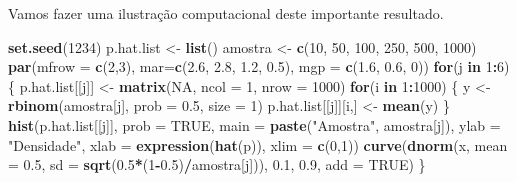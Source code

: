 \documentclass[10pt,a4paper]{book}
\newenvironment{Shaded}{\begin{snugshade}}{\end{snugshade}}
\newcommand{\KeywordTok}[1]{\textcolor[rgb]{0.13,0.29,0.53}{\textbf{#1}}}
\newcommand{\DataTypeTok}[1]{\textcolor[rgb]{0.13,0.29,0.53}{#1}}
\newcommand{\DecValTok}[1]{\textcolor[rgb]{0.00,0.00,0.81}{#1}}
\newcommand{\FloatTok}[1]{\textcolor[rgb]{0.00,0.00,0.81}{#1}}
\newcommand{\StringTok}[1]{\textcolor[rgb]{0.31,0.60,0.02}{#1}}
\newcommand{\OtherTok}[1]{\textcolor[rgb]{0.56,0.35,0.01}{#1}}
\newcommand{\ControlFlowTok}[1]{\textcolor[rgb]{0.13,0.29,0.53}{\textbf{#1}}}
\newcommand{\OperatorTok}[1]{\textcolor[rgb]{0.81,0.36,0.00}{\textbf{#1}}}
\newcommand{\NormalTok}[1]{#1}
\begin{document}
Vamos fazer uma ilustração computacional deste importante resultado.

\begin{Shaded}
\begin{Highlighting}[]
\KeywordTok{set.seed}\NormalTok{(}\DecValTok{1234}\NormalTok{)}
\NormalTok{p.hat.list <-}\StringTok{ }\KeywordTok{list}\NormalTok{()}
\NormalTok{amostra <-}\StringTok{ }\KeywordTok{c}\NormalTok{(}\DecValTok{10}\NormalTok{, }\DecValTok{50}\NormalTok{, }\DecValTok{100}\NormalTok{, }\DecValTok{250}\NormalTok{, }\DecValTok{500}\NormalTok{, }\DecValTok{1000}\NormalTok{)}
\KeywordTok{par}\NormalTok{(}\DataTypeTok{mfrow =} \KeywordTok{c}\NormalTok{(}\DecValTok{2}\NormalTok{,}\DecValTok{3}\NormalTok{), }\DataTypeTok{mar=}\KeywordTok{c}\NormalTok{(}\FloatTok{2.6}\NormalTok{, }\FloatTok{2.8}\NormalTok{, }\FloatTok{1.2}\NormalTok{, }\FloatTok{0.5}\NormalTok{), }\DataTypeTok{mgp =} \KeywordTok{c}\NormalTok{(}\FloatTok{1.6}\NormalTok{, }\FloatTok{0.6}\NormalTok{, }\DecValTok{0}\NormalTok{))}
\ControlFlowTok{for}\NormalTok{(j }\ControlFlowTok{in} \DecValTok{1}\OperatorTok{:}\DecValTok{6}\NormalTok{) \{}
\NormalTok{  p.hat.list[[j]] <-}\StringTok{ }\KeywordTok{matrix}\NormalTok{(}\OtherTok{NA}\NormalTok{, }\DataTypeTok{ncol =} \DecValTok{1}\NormalTok{, }\DataTypeTok{nrow =} \DecValTok{1000}\NormalTok{)}
  \ControlFlowTok{for}\NormalTok{(i }\ControlFlowTok{in} \DecValTok{1}\OperatorTok{:}\DecValTok{1000}\NormalTok{) \{}
\NormalTok{  y <-}\StringTok{ }\KeywordTok{rbinom}\NormalTok{(amostra[j], }\DataTypeTok{prob =} \FloatTok{0.5}\NormalTok{, }\DataTypeTok{size =} \DecValTok{1}\NormalTok{)}
\NormalTok{  p.hat.list[[j]][i,] <-}\StringTok{ }\KeywordTok{mean}\NormalTok{(y)}
\NormalTok{  \}}
  \KeywordTok{hist}\NormalTok{(p.hat.list[[j]], }\DataTypeTok{prob =} \OtherTok{TRUE}\NormalTok{, }\DataTypeTok{main =} \KeywordTok{paste}\NormalTok{(}\StringTok{"Amostra"}\NormalTok{, amostra[j]), }
       \DataTypeTok{ylab =} \StringTok{"Densidade"}\NormalTok{, }\DataTypeTok{xlab =} \KeywordTok{expression}\NormalTok{(}\KeywordTok{hat}\NormalTok{(p)), }\DataTypeTok{xlim =} \KeywordTok{c}\NormalTok{(}\DecValTok{0}\NormalTok{,}\DecValTok{1}\NormalTok{))}
  \KeywordTok{curve}\NormalTok{(}\KeywordTok{dnorm}\NormalTok{(x, }\DataTypeTok{mean =} \FloatTok{0.5}\NormalTok{, }\DataTypeTok{sd =} \KeywordTok{sqrt}\NormalTok{(}\FloatTok{0.5}\OperatorTok{*}\NormalTok{(}\DecValTok{1}\OperatorTok{-}\FloatTok{0.5}\NormalTok{)}\OperatorTok{/}\NormalTok{amostra[j])), }\FloatTok{0.1}\NormalTok{, }\FloatTok{0.9}\NormalTok{, }\DataTypeTok{add =} \OtherTok{TRUE}\NormalTok{)}
\NormalTok{\}}
\end{Highlighting}
\end{Shaded}
\end{document}
